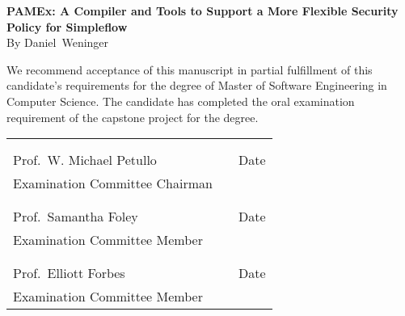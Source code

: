 \thispagestyle{empty}
\vspace*{0.3in}
\begin{center}
	\large{\textbf{PAMEx: A Compiler and Tools to Support a More Flexible Security Policy for Simpleflow}} \\ 
	\vspace{0.75in}
	\normalsize{By Daniel\ Weninger}
\end{center}

\vspace{0.5in}
\noindent We recommend acceptance of this manuscript in partial fulfillment of this candidate's requirements for the degree of Master of Software Engineering in Computer Science. The candidate has completed the oral examination requirement of the capstone project for the degree. \\

\noindent
\begin{tabularx}{\textwidth}{p{3in}Xp{2in}}
	\rule{0pt}{50pt} & & \\
	\hrulefill & & \hrulefill \\
	Prof.\ W. Michael Petullo & & Date \\
	Examination Committee Chairman & & \\
	\rule{0pt}{50pt} & & \\
	\hrulefill & & \hrulefill \\
	Prof.\ Samantha Foley & & Date \\
	Examination Committee Member & & \\
	\rule{0pt}{50pt} & & \\
	\hrulefill & & \hrulefill \\
	Prof.\ Elliott Forbes & & Date \\
	Examination Committee Member & & \\
\end{tabularx}

